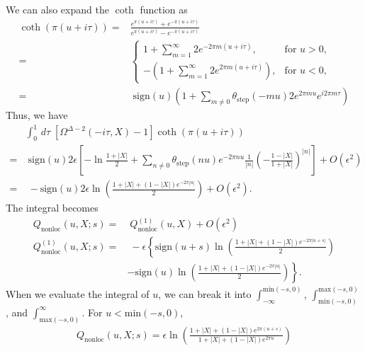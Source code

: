 \documentclass[a4paper,11pt]{article}
\theoremstyle{definition}
\begin{document}
We can also expand the $\coth$ function as
\begin{align}
    \coth(\pi (u+i\tau)) =& \frac{e^{\pi (u+i\tau)}+e^{-\pi (u+i\tau)}}{e^{\pi (u+i\tau)}-e^{-\pi (u+i\tau)}} \nonumber\\
    =& \begin{cases}
        1+\sum_{m=1}^{\infty} 2e^{-2\pi m (u+i\tau)}, & \text{for } u > 0,\\
        -(1+\sum_{m=1}^{\infty} 2e^{2\pi m (u+i\tau)}), & \text{for } u < 0,
    \end{cases}\\
    =& \;\text{sign}(u) \left(1+ \sum_{m \neq 0 } \theta_{\text{step}}(-mu)2 e^{2\pi m u} e^{i2\pi m \tau}\right)
\end{align}
Thus, we have
\begin{align}
    &\int_0^1 \, d\tau \; \left[\Omega^{\Delta-2}(-i\tau,X) -1\right] \coth(\pi(u+i\tau)) \nonumber\\
    =&\; \text{sign}(u)2\epsilon\left[-\ln\frac{1+|X|}{2}+\sum_{n\neq0} \theta_{\text{step}}(nu) e^{-2\pi n u} \frac{1}{|n|}\left(-\frac{1-|X|}{1+|X|}\right)^{|n|} \right] +O(\epsilon^2)\\
    =&\; -\text{sign}(u)2\epsilon \ln\left(\frac{1+|X| +(1-|X|)e^{-2\pi|u|}}{2}\right) +O(\epsilon^2).
\end{align}
The integral becomes
\begin{align}
    Q_{\text{nonloc}}(u,X;s) =&\; Q^{(1)}_{\text{nonloc}}(u,X) + O(\epsilon^2)\\
    Q^{(1)}_{\text{nonloc}}(u,X;s) =&\; -\epsilon\left\{ \text{sign}(u+s)\ln\left(\frac{1+|X| +(1-|X|)e^{-2\pi|u+s|}}{2}\right) \right. \nonumber\\
    & \left.- \text{sign}(u)\ln\left(\frac{1+|X| +(1-|X|)e^{-2\pi|u|}}{2}\right) \right\}.
\end{align}
When we evaluate the integral of $u$, we can break it into $\int_{-\infty}^{\text{min}(-s,0)}$, $\int_{\text{min}(-s,0)}^{\text{max}(-s,0)}$, and $\int_{\text{max}(-s,0)}^{\infty}$. For $u<\text{min}(-s,0)$, 
\begin{gather}
    Q_{\text{nonloc}}(u,X;s) = \epsilon\ln\left( \frac{1+|X| +(1-|X|)e^{2\pi(u+s)}}{1+|X| +(1-|X|)e^{2\pi u}}\right)
\end{gather}
\end{document}

